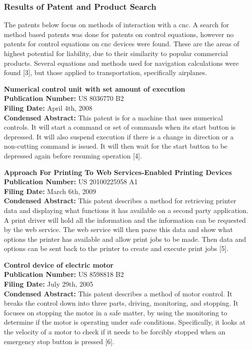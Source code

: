 \subsubsection{Results of Patent and Product Search}
The patents below focus on methods of interaction with a \gls{cnc}.
A search for method based patents was done for patents on control equations, however no patents for control equations on \gls{cnc} devices were found.
These are the areas of highest potential for liability, due to their similarity to popular commercial products.
Several equations and methods used for navigation calculations were found [3], but those applied to transportation, specifically airplanes.

\textbf{Numerical control unit with set amount of execution} \\
\textbf{Publication Number:} US 8036770 B2 \\
\textbf{Filing Date:} April 4th, 2008 \\
\textbf{Condensed Abstract:}
This patent is for a machine that uses numerical controls.
It will start a command or set of commands when its start button is depressed.
It will also suspend execution if there is a change in direction or a non-cutting command is issued.
It will then wait for the start button to be depressed again before resuming operation [4].

\textbf{Approach For Printing To Web Services-Enabled Printing Devices} \\
\textbf{Publication Number:} US 20100225958 A1 \\
\textbf{Filing Date:} March 6th, 2009 \\
\textbf{Condensed Abstract:}
This patent describes a method for retrieving printer data and displaying what functions it has available on a second party application.
A print driver will hold all the information and the information can be requested by the web service.
The web service will then parse this data and show what options the printer has available and allow print jobs to be made.
Then data and options can be sent back to the printer to create and execute print jobs [5].

\textbf{Control device of electric motor} \\
\textbf{Publication Number:} US 8598818 B2 \\
\textbf{Filing Date:} July 29th, 2005 \\
\textbf{Condensed Abstract:}
This patent describes a method of motor control. 
It breaks the control down into three parts, driving, monitoring, and stopping.
It focuses on stopping the motor in a safe matter, by using the monitoring to determine if the motor is operating under safe conditions.
Specifically, it looks at the velocity of a motor to check if it needs to be forcibly stopped when an emergency stop button is pressed [6].

